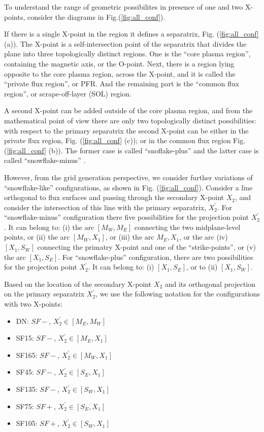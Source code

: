 To understand the range of geometric possibilites in presence of one
and two X-points, consider the diagrams in Fig.(\ref{fig:all_conf}).

If there is a single X-point in the region it defines a separatrix,
Fig. (\ref{fig:all_conf} (a)). The X-point is a self-intersection
point of the separatrix that divides the plane into three
topologically distinct regions. One is the ``core plasma region'',
containing the magnetic axis, or the O-point. Next, there is a region
lying opposite to the core plasma region, across the X-point, and it
is called the ``private flux region'', or PFR. And the remaining part
is the ``common flux region'', or scrape-off-layer (SOL) region.

A second X-point can be added outside of the core plasma region, and
from the mathematical point of view there are only two topologically
distinct possibilities: with respect to the primary separatrix the
second X-point can be either in the private flux region,
Fig. (\ref{fig:all_conf} (c)); or in the common flux region
Fig. (\ref{fig:all_conf} (b)). The former case is called
``snoflake-plus'' and the latter case is called ``snowflake-minus''
\cite{}.

However, from the grid generation perspective, we consider further
variations of ``snowflake-like'' configurations, as shown in
Fig. (\ref{fig:all_conf}). Consider a line orthogonal to flux surfaces
and passing through the secondary X-point $X_2$, and consider the
intersection of this line with the primary separatrix,
$X^{\prime}_2$. For ``snowflake-minus'' configuration there five
possibilities for the projection point $X^{\prime}_2$. It can belong
to: (i) the arc $[M_W,M_E]$ connecting the two midplane-level points,
or (ii) the arc $[M_W,X_1]$, or (iii) the arc $M_E,X_1$, or the arc
(iv) $[X_1,S_W]$ connecting the primatry X-point and one of the
``strike-points'', or (v) the arc $[X_1,S_E]$. For ``snowflake-plus''
configuration, there are two possibilities for the projection point
$X^{\prime}_2$. It can belong to: (i) $[X_1,S_E]$, or to (ii)
$[X_1,S_W]$.

Based on the location of the secondary X-point $X_2$ and its
orthogonal projection on the primary separatrix $X_2^{\prime}$, we use
the following notation for the configurations with two X-points:

\begin{itemize}
	\item DN: $SF-$, $X^{\prime}_2 \in [M_E,M_W]$
	\item SF15: $SF-$, $X^{\prime}_2 \in [M_E,X_1]$
	\item SF165: $SF-$, $X^{\prime}_2 \in [M_W,X_1]$
        \item SF45: $SF-$, $X^{\prime}_2 \in [S_E,X_1]$
        \item SF135: $SF-$, $X^{\prime}_2 \in [S_W,X_1]$
        \item SF75: $SF+$, $X^{\prime}_2 \in [S_E,X_1]$
        \item SF105: $SF+$, $X^{\prime}_2 \in [S_W,X_1]$
\end{itemize}

